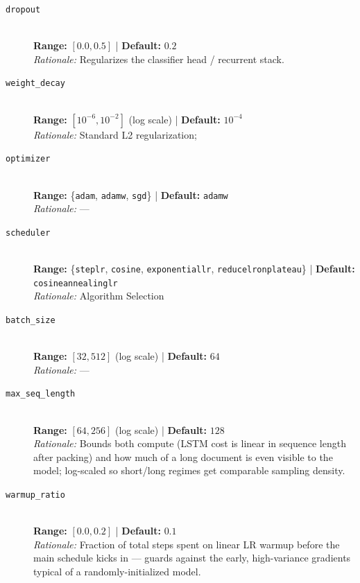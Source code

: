 \documentclass[10pt]{article}
\begin{document}
\begin{description}
    \item[\texttt{dropout}] \hfill \\
    \textbf{Range:} $[0.0, 0.5]$ \quad | \quad \textbf{Default:} $0.2$ \\
    \textit{Rationale:} Regularizes the classifier head / recurrent stack.

    \item[\texttt{weight\_decay}] \hfill \\
    \textbf{Range:} $[10^{-6}, 10^{-2}]$ (log scale) \quad | \quad \textbf{Default:} $10^{-4}$ \\
    \textit{Rationale:} Standard L2 regularization;

    \item[\texttt{optimizer}] \hfill \\
    \textbf{Range:} \{\texttt{adam}, \texttt{adamw}, \texttt{sgd}\} \quad | \quad \textbf{Default:} \texttt{adamw} \\
    \textit{Rationale:} ---

    \item[\texttt{scheduler}] \hfill \\
    \textbf{Range:} \{\texttt{steplr}, \texttt{cosine}, \texttt{exponentiallr}, \texttt{reducelronplateau}\} \quad | \quad \textbf{Default:} \texttt{cosineannealinglr} \\
    \textit{Rationale:} Algorithm Selection

    \item[\texttt{batch\_size}] \hfill \\
    \textbf{Range:} $[32, 512]$ (log scale) \quad | \quad \textbf{Default:} $64$ \\
    \textit{Rationale:} ---

    \item[\texttt{max\_seq\_length}] \hfill \\
    \textbf{Range:} $[64, 256]$ (log scale) \quad | \quad \textbf{Default:} $128$ \\
    \textit{Rationale:} Bounds both compute (LSTM cost is linear in sequence length after packing) and how much of a long document is even visible to the model; log-scaled so short/long regimes get comparable sampling density.

    \item[\texttt{warmup\_ratio}] \hfill \\
    \textbf{Range:} $[0.0, 0.2]$ \quad | \quad \textbf{Default:} $0.1$ \\
    \textit{Rationale:} Fraction of total steps spent on linear LR warmup before the main schedule kicks in --- guards against the early, high-variance gradients typical of a randomly-initialized model.
\end{description}
\end{document}
